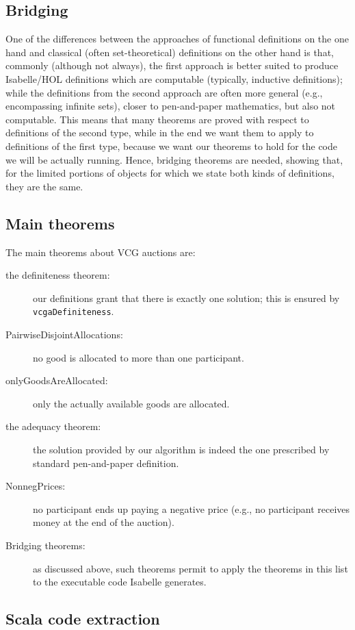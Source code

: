 \documentclass[11pt,a4paper]{article}
\begin{document}
\subsection{Bridging}

One of the differences between the approaches of functional
definitions on the one hand and classical (often set-theoretical)
definitions on the other hand is that, commonly (although not always),
the first approach is better suited to produce Isabelle/HOL
definitions which are computable (typically, inductive definitions);
while the definitions from the second approach are often more general
(e.g., encompassing infinite sets), closer to pen-and-paper
mathematics, but also not computable.  This means that many theorems
are proved with respect to definitions of the second type, while in
the end we want them to apply to definitions of the first type,
because we want our theorems to hold for the code we will be actually
running.  Hence, bridging theorems are needed, showing that, for the
limited portions of objects for which we state both kinds of
definitions, they are the same.

\subsection{Main theorems}

The main theorems about VCG auctions are:
\begin{description}
  \item[the definiteness theorem:] our definitions grant that there is exactly one solution; this is 
    ensured by \texttt{vcgaDefiniteness}.
  \item[PairwiseDisjointAllocations:] no good is allocated to more than one participant.
  \item[onlyGoodsAreAllocated:] only the actually available goods are allocated.
  \item[the adequacy theorem:] the solution provided by our algorithm is indeed the one prescribed by
    standard pen-and-paper definition.
  \item[NonnegPrices:] no participant ends up paying a negative price 
    (e.g., no participant receives money at the end of the auction).
  \item[Bridging theorems:] as discussed above, such theorems permit to apply the theorems in this 
    list to the executable code Isabelle generates.
\end{description}

\subsection{Scala code extraction}
\end{document}
